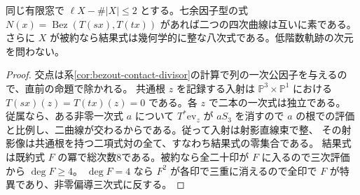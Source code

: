 \begin{corollary}\label{cor:bezout-integral-without-cleanliness}
同じ有限窓で $\ell X-\#|X|\le2$ とする。七余因子型の式
$N(x)=\operatorname{Bez}(T(sx),T(tx))$ があれば二つの四次曲線は互いに素である。
さらに $X$ が被約なら結果式は幾何学的に整な八次式である。低階数軌跡の次元を問わない。
\end{corollary}
\begin{proof}
交点は系\ref{cor:bezout-contact-divisor}の計算で列の一次公因子を与えるので、直前の命題で除かれる。
共通根 $z$ を記録する入射は $\mathbb P^3\times\mathbb P^1$ における
$T(sx)(z)=T(tx)(z)=0$ である。各 $z$ で二本の一次式は独立である。
従属なら、ある非零一次式 $a$ について $T^*\mathrm{ev}_z$ が $aS_3$ を消すので
$a$ の根での評価と比例し、二曲線が交わるからである。従って入射は射影直線束で整、
その射影像は共通根を持つ二項式対の全て、すなわち結果式の零集合である。
結果式は既約式 $F$ の冪で総次数8である。被約なら全二十印が $F$ に入るので三次評価から $\deg F\ge4$。
$\deg F=4$ なら $F^2$ が各印で三重に消えるので全印で $F$ が特異であり、非零偏導三次式に反する。
\end{proof}
